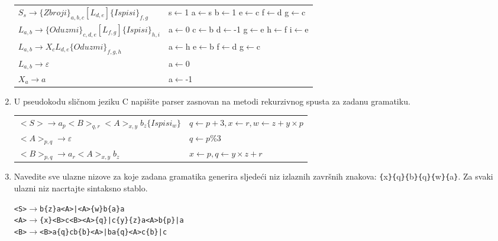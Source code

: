 \documentclass[times, 12pt, utf8]{book}
\begin{document}
\begin{enumerate}[resume]
\begin{tabular}{ll} 
\( S_{s} \to \{Zbroji\}_{a,b,c} [ L_{d,e} ] \{Ispisi\}_{f,g} \)  &  s\(\leftarrow\)1 a\(\leftarrow\)s b\(\leftarrow\)1 e\(\leftarrow\)c f\(\leftarrow\)d g\(\leftarrow\)c \\
\( L_{a,b} \to \{Oduzmi\}_{c,d,e} [ L_{f,g} ] \{Ispisi\}_{h,i} \)  &  a\(\leftarrow\)0 c\(\leftarrow\)b d\(\leftarrow\)-1 g\(\leftarrow\)e h\(\leftarrow\)f i\(\leftarrow\)e \\
\(L_{a,b} \to X_{c} L_{d,e} \{Oduzmi\}_{f,g,h} \)  &  a\(\leftarrow\)h e\(\leftarrow\)b f\(\leftarrow\)d g\(\leftarrow\)c \\
\(L_{a,b} \to \varepsilon \)  &  a\(\leftarrow\)0 \\
\(X_{a} \to a \) &  a\(\leftarrow\)-1 \\
\end{tabular} 

\item
U pseudokodu sličnom jeziku C napišite parser zasnovan na metodi rekurzivnog spusta za zadanu gramatiku. \cite[str.~195-198]{udzbenik}

\begin{tabular}{ll} 
\( <S> \to a_{p} <B>_{q, r} <A>_{x, y} b_{z} \{Ispisi_{w}\} \) & \( q \leftarrow p + 3, x \leftarrow r, w \leftarrow z + y \times p \) \\
\( <A>_{p,q} \to \varepsilon	 \) & \( q \leftarrow p \% 3 \) \\
\( <B>_{p, q} \to a_{r} <A>_{x, y} b_{z} \)& \(x \leftarrow p, q \leftarrow y \times z + r \) \\
\end{tabular} 

\item
Navedite sve ulazne nizove za koje zadana gramatika generira sljedeći niz izlaznih završnih znakova: \verb|{|x\verb|}|\verb|{|q\verb|}|\verb|{|b\verb|}|\verb|{|q\verb|}|\verb|{|w\verb|}|\verb|{|a\verb|}|. Za svaki ulazni niz nacrtajte sintaksno stablo. \cite[str.~171]{udzbenik}

\begin{alltt}
<S>	\(\to\)	b \verb|{|z\verb|}| a<A> | <A> \verb|{|w\verb|}| b \verb|{|a\verb|}| a
<A>	\(\to\)	\verb|{|x\verb|}| <B>c<B><A> \verb|{|q\verb|}| | c \verb|{|y\verb|}| \verb|{|z\verb|}| a <A> b \verb|{|p\verb|}| | a
<B>	\(\to\)	<B> a \verb|{|q\verb|}| c b \verb|{|b\verb|}| <A> | b a \verb|{|q\verb|}| <A> c \verb|{|b\verb|}| | c
\end{alltt} 


\end{enumerate}
\end{document}
